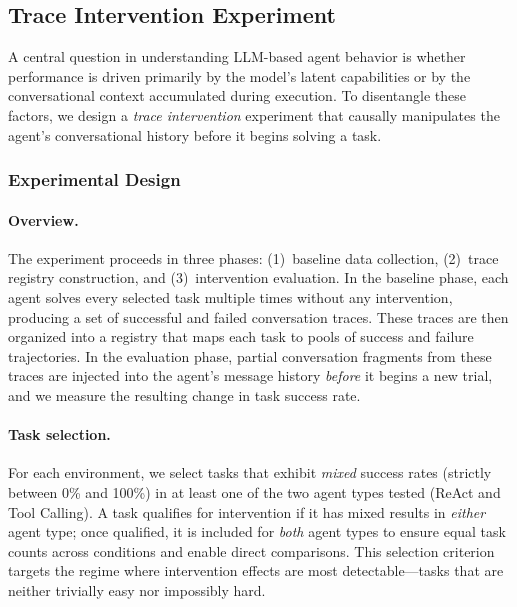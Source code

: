 \subsection{Trace Intervention Experiment}
\label{sec:intervention}

A central question in understanding LLM-based agent behavior is whether performance is driven primarily by the model's latent capabilities or by the conversational context accumulated during execution.
To disentangle these factors, we design a \emph{trace intervention} experiment that causally manipulates the agent's conversational history before it begins solving a task.

\subsubsection{Experimental Design}

\paragraph{Overview.}
The experiment proceeds in three phases: (1)~baseline data collection, (2)~trace registry construction, and (3)~intervention evaluation.
In the baseline phase, each agent solves every selected task multiple times without any intervention, producing a set of successful and failed conversation traces.
These traces are then organized into a registry that maps each task to pools of success and failure trajectories.
In the evaluation phase, partial conversation fragments from these traces are injected into the agent's message history \emph{before} it begins a new trial, and we measure the resulting change in task success rate.

\paragraph{Task selection.}
For each environment, we select tasks that exhibit \emph{mixed} success rates (strictly between 0\% and 100\%) in at least one of the two agent types tested (ReAct and Tool Calling).
A task qualifies for intervention if it has mixed results in \emph{either} agent type; once qualified, it is included for \emph{both} agent types to ensure equal task counts across conditions and enable direct comparisons.
This selection criterion targets the regime where intervention effects are most detectable---tasks that are neither trivially easy nor impossibly hard.

